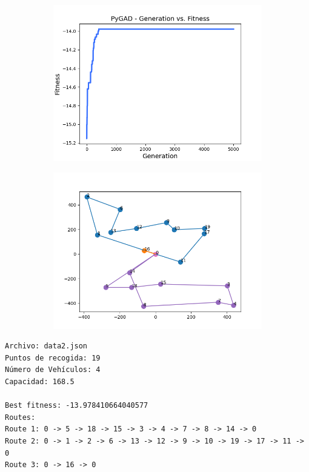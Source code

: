 \documentclass[12pt]{llncs}
\begin{document}
\begin{figure}[!ht]
    \centering
    \begin{subfigure}[b]{0.496\linewidth}
      \includegraphics[width=\linewidth]{../../images/data2-training.png}
    \end{subfigure}
    \begin{subfigure}[b]{0.496\linewidth}
      \includegraphics[width=\linewidth]{../../images/data2-graph.png}
    \end{subfigure}
    \label{fig:data2}
\end{figure}

\begin{verbatim}
Archivo: data2.json
Puntos de recogida: 19
Número de Vehículos: 4
Capacidad: 168.5

Best fitness: -13.978410664040577
Routes:
Route 1: 0 -> 5 -> 18 -> 15 -> 3 -> 4 -> 7 -> 8 -> 14 -> 0
Route 2: 0 -> 1 -> 2 -> 6 -> 13 -> 12 -> 9 -> 10 -> 19 -> 17 -> 11 -> 0
Route 3: 0 -> 16 -> 0
\end{verbatim}
\end{document}
